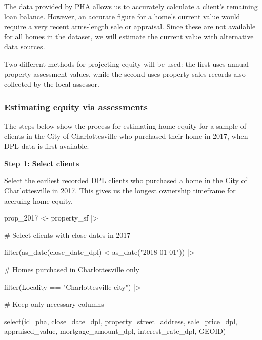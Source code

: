 \documentclass[
  letterpaper,
  DIV=11,
  numbers=noendperiod]{scrartcl}
\newenvironment{Shaded}{\begin{snugshade}}{\end{snugshade}}
\newcommand{\CommentTok}[1]{\textcolor[rgb]{0.37,0.37,0.37}{#1}}
\newcommand{\FunctionTok}[1]{\textcolor[rgb]{0.28,0.35,0.67}{#1}}
\newcommand{\NormalTok}[1]{\textcolor[rgb]{0.00,0.23,0.31}{#1}}
\newcommand{\OtherTok}[1]{\textcolor[rgb]{0.00,0.23,0.31}{#1}}
\newcommand{\SpecialCharTok}[1]{\textcolor[rgb]{0.37,0.37,0.37}{#1}}
\newcommand{\StringTok}[1]{\textcolor[rgb]{0.13,0.47,0.30}{#1}}
\begin{document}
The data provided by PHA allows us to accurately calculate a client's
remaining loan balance. However, an accurate figure for a home's current
value would require a very recent arms-length sale or appraisal. Since
these are not available for all homes in the dataset, we will estimate
the current value with alternative data sources.

Two different methods for projecting equity will be used: the first uses
annual property assessment values, while the second uses property sales
records also collected by the local assessor.

\hypertarget{estimating-equity-via-assessments}{%
\subsubsection{Estimating equity via
assessments}\label{estimating-equity-via-assessments}}

The steps below show the process for estimating home equity for a sample
of clients in the City of Charlottesville who purchased their home in
2017, when DPL data is first available.

\textbf{Step 1: Select clients}

Select the earliest recorded DPL clients who purchased a home in the
City of Charlottesville in 2017. This gives us the longest ownership
timeframe for accruing home equity.

\begin{Shaded}
\begin{Highlighting}[]
\NormalTok{prop\_2017 }\OtherTok{\textless{}{-}}\NormalTok{ property\_sf }\SpecialCharTok{|\textgreater{}} 
  
  \CommentTok{\# Select clients with close dates in 2017}
  
  \FunctionTok{filter}\NormalTok{(}\FunctionTok{as\_date}\NormalTok{(close\_date\_dpl) }\SpecialCharTok{\textless{}} \FunctionTok{as\_date}\NormalTok{(}\StringTok{"2018{-}01{-}01"}\NormalTok{)) }\SpecialCharTok{|\textgreater{}} 
  
  \CommentTok{\# Homes purchased in Charlottesville only}
  
  \FunctionTok{filter}\NormalTok{(Locality }\SpecialCharTok{==} \StringTok{"Charlottesville city"}\NormalTok{) }\SpecialCharTok{|\textgreater{}} 
  
  \CommentTok{\# Keep only necessary columns}
  
  \FunctionTok{select}\NormalTok{(id\_pha, close\_date\_dpl, property\_street\_address, sale\_price\_dpl,}
\NormalTok{         appraised\_value, mortgage\_amount\_dpl, interest\_rate\_dpl, GEOID)}
\end{Highlighting}
\end{Shaded}
\end{document}
